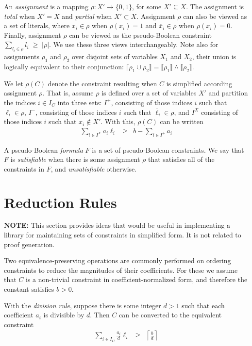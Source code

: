 \documentclass{easychair}
\renewcommand{\obar}[1]{\overline{#1}}
\newcommand{\lit}{\ell}
\newcommand{\assign}{\rho}
\newcommand{\indices}{I}
\newcommand{\func}[1]{\llbracket#1\rrbracket}
\begin{document}
An {\em assignment} is a mapping $\assign : X' \rightarrow \{0,1\}$,
for some $X' \subseteq X$.  The assignment is {\em total} when $X' =
X$ and {\em partial} when $X' \subset X$.  Assignment $\assign$ can
also be viewed as a set of literals, where $x_i \in \assign$ when
$\assign(x_i) = 1$ and $\obar{x}_i \in \assign$ when $\assign(x_i) = 0$.
Finally, assignment $\assign$ can be viewed as the
pseudo-Boolean constraint $\sum_{l_i \in \assign} l_i \;\geq\;| \assign |$.
We use these three views interchangeably.  Note also for
assignments $\assign_1$ and $\assign_2$ over disjoint sets of
variables $X_1$ and $X_2$, their union is logically equivalent to
their conjunction: $\func{\assign_1 \cup \assign_2} = \func{\assign_1}
\land \func{\assign_2}$.

We let $\assign(C)$ denote the constraint resulting when $C$ is
simplified according assignment $\assign$.  That is, assume $\assign$ is defined over a set of variables $X'$ and
partition the indices $i \in \indices_C$ into
three sets:
$I^{+}$, consisting of those indices $i$ such that $\lit_{i} \in \assign$,
$I^{-}$, consisting of those indices $i$ such that $\obar{\lit}_{i} \in \assign$,
and $I^{X}$ consisting of those indices $i$ such that $x_i \not \in X'$.
With this, $\assign(C)$ can be written
\begin{eqnarray}
\sum_{i \in I^{X}} a_{i} \lit_{i} & \geq & b - \sum_{i \in I^{+}} a_{i} \label{eqn:assigned}
\end{eqnarray}

A pseudo-Boolean {\em formula} $F$ is a set of pseudo-Boolean
constraints.  We say that $F$ is {\em satisfiable} when there is some
assignment $\assign$ that satisfies all of the constraints in $F$, and
{\em unsatisfiable} otherwise.  

\section{Reduction Rules}

{\bf NOTE:} This section provides ideas that would be useful in
implementing a library for maintaining sets of constraints in
simplified form.  It is not related to proof generation.

Two equivalence-preserving operations are commonly performed on ordering
constraints to reduce the magnitudes of their coefficients.  For these
we assume that $C$ is a non-trivial constraint in
coefficient-normalized form, and therefore the constant satisfies $b > 0$.

With the {\em division rule},
suppose
there is some integer $d > 1$
such that each coefficient $a_i$ is divisible by $d$.  Then $C$ can be converted to the equivalent constraint
\begin{eqnarray}
\sum_{i \in \indices_C} \frac{a_i}{d} \lit_i & \geq & \left\lceil \frac{b}{d} \right\rceil \label{eqn:divide}
\end{eqnarray}
\end{document}
